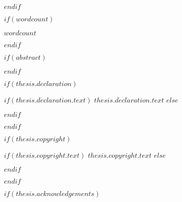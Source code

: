 

$endif$

$if(wordcount)$

\begin{wordcount}
$wordcount$
\end{wordcount}

$endif$

$if(abstract)$

\begin{abstract}[]
\addchaptertocentry{\abstractname} %
$abstract$
\end{abstract}

$endif$

$if(thesis.declaration)$
\begin{declaration}
\addchaptertocentry{\authorshipname} %
$if(thesis.declaration.text)$
$thesis.declaration.text$
$else$

$endif$

\end{declaration}

$endif$


$if(thesis.copyright)$
\begin{copyright}
\addchaptertocentry{\copyrightname} %
$if(thesis.copyright.text)$
$thesis.copyright.text$
$else$

$endif$

\end{copyright}

$endif$

$if(thesis.acknowledgements)$


